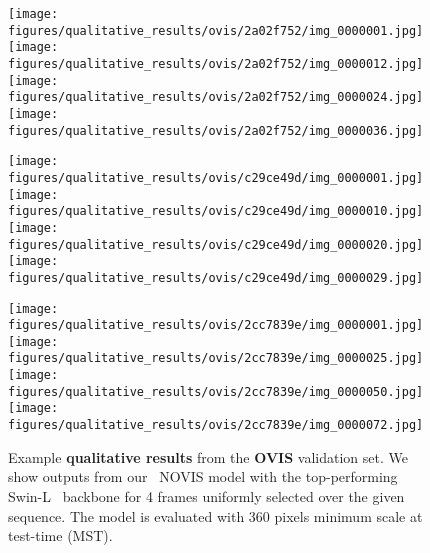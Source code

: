 \documentclass{article}
\newcommand{\method}{\mbox{NOVIS}}
\theoremstyle{plain}
\theoremstyle{definition}
\theoremstyle{remark}
\begin{document}
\begin{figure*}[t]
    \texttt{[image: figures/qualitative\_results/ovis/2a02f752/img\_0000001.jpg]}
    \texttt{[image: figures/qualitative\_results/ovis/2a02f752/img\_0000012.jpg]}
    \texttt{[image: figures/qualitative\_results/ovis/2a02f752/img\_0000024.jpg]}
    \texttt{[image: figures/qualitative\_results/ovis/2a02f752/img\_0000036.jpg]}

    \texttt{[image: figures/qualitative\_results/ovis/c29ce49d/img\_0000001.jpg]}
    \texttt{[image: figures/qualitative\_results/ovis/c29ce49d/img\_0000010.jpg]}
    \texttt{[image: figures/qualitative\_results/ovis/c29ce49d/img\_0000020.jpg]}
    \texttt{[image: figures/qualitative\_results/ovis/c29ce49d/img\_0000029.jpg]}

    \texttt{[image: figures/qualitative\_results/ovis/2cc7839e/img\_0000001.jpg]}
    \texttt{[image: figures/qualitative\_results/ovis/2cc7839e/img\_0000025.jpg]}
    \texttt{[image: figures/qualitative\_results/ovis/2cc7839e/img\_0000050.jpg]}
    \texttt{[image: figures/qualitative\_results/ovis/2cc7839e/img\_0000072.jpg]}
    
    \caption{
Example \textbf{qualitative results} from the \textbf{OVIS} validation set.
We show outputs from our ~\method{} model with the top-performing Swin-L~\cite{SwinTransformer} backbone for 4 frames uniformly selected over the given sequence.
The model is evaluated with 360 pixels minimum scale at test-time (MST).
    }
    \label{fig:qualitative_results_ovis}
\end{figure*} 



\clearpage 
\end{document}

